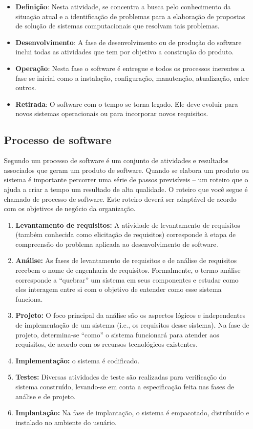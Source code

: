 \begin{itemize}
	\item \textbf{Definição}: Nesta atividade, se concentra a busca pelo conhecimento da situação atual e a identificação de problemas para a elaboração de propostas de solução de sistemas computacionais que resolvam tais problemas.
	\item \textbf{Desenvolvimento}: A fase de desenvolvimento ou de produção do software inclui todas as atividades que tem por objetivo a construção do produto.
	\item \textbf{Operação}: Nesta fase o software é entregue e todos os processos inerentes a fase se inicial como a instalação, configuração, manutenção, atualização, entre outros.
	\item \textbf{Retirada}: O software com o tempo se torna legado. Ele deve evoluir para novos sistemas operacionais ou para incorporar novos requisitos.
\end{itemize}

\subsection{Processo de software}

Segundo  um processo de software é um conjunto de atividades e resultados associados que geram um produto de software. Quando se elabora um produto ou sistema é importante percorrer uma série de passos previsíveis – um roteiro que o ajuda a criar a tempo um resultado de alta qualidade. O roteiro que você segue é chamado de processo de software. Este roteiro deverá ser adaptável de acordo com os objetivos de negócio da organização.

\begin{enumerate}
	\item \textbf{Levantamento de requisitos:} A atividade de levantamento de requisitos (também conhecida como elicitação de requisitos) corresponde à etapa de compreensão do problema aplicada ao desenvolvimento de software.
	\item  \textbf{Análise:} As fases de levantamento de requisitos e de análise de requisitos recebem o nome de engenharia de requisitos. Formalmente, o termo análise corresponde a “quebrar” um sistema em seus componentes e estudar como eles interagem entre si com o objetivo de entender como esse sistema funciona.
	\item \textbf{Projeto:} O foco principal da análise são os aspectos lógicos e independentes de implementação de um sistema (i.e., os requisitos desse sistema). Na fase de projeto, determina-se “como” o sistema funcionará para atender aos requisitos, de acordo com os recursos tecnológicos existentes.
	\item \textbf{Implementação:} o sistema é codificado.
	\item \textbf{Testes:} Diversas atividades de teste são realizadas para verificação do sistema construído, levando-se em conta a especificação feita nas fases de análise e de projeto.
	\item \textbf{Implantação:} Na fase de implantação, o sistema é empacotado, distribuído e instalado no ambiente do usuário.
\end{enumerate}

